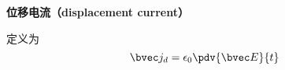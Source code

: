 
\begin{issues}
\issueDraft
\end{issues}


\textbf{位移电流（displacement current）}

定义为
\begin{equation}
\bvec j_d = \epsilon_0 \pdv{\bvec E}{t}
\end{equation}
